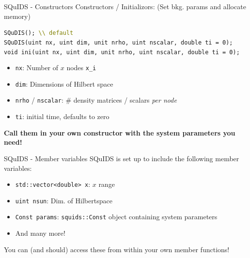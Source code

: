 \documentclass[]{beamer}
\begin{document}
\begin{frame}{SQuIDS - Constructors}
  Constructors / Initializors: (Set bkg. params and allocate memory)
  \begin{tcolorbox}[colback=gray!5!white]
    \texttt{SQuDIS(); \textcolor{olive}{\textbackslash\textbackslash {} default}} \\
    \texttt{SQuDIS(uint nx, uint dim, unit nrho, uint nscalar, double ti = 0);} \\
    \texttt{void ini(uint nx, uint dim, unit nrho, uint nscalar, double ti = 0);}
  \end{tcolorbox}
  \begin{itemize}
    \item \texttt{nx}: Number of \(x\) nodes \texttt{x\_i}
    \item \texttt{dim}: Dimensions of Hilbert space
    \item \texttt{nrho} / \texttt{nscalar}: \# density matrices / scalars \emph{per node}
    \item \texttt{ti}: initial time, defaults to zero
  \end{itemize}
  \textbf{Call them in your own constructor with the system parameters you need!}
\end{frame}

\begin{frame}{SQuIDS - Member variables}
  SQuIDS is set up to include the following member variables:
  \begin{itemize}
    \item \texttt{std::vector<double> x}: \(x\) range
    \item \texttt{uint nsun}: Dim. of Hilbertspace
    \item \texttt{Const params}: \texttt{squids::Const} object containing system parameters
    \item And many more!
  \end{itemize}
  You can (and should) access these from within your own member functions!
\end{frame}
\end{document}
